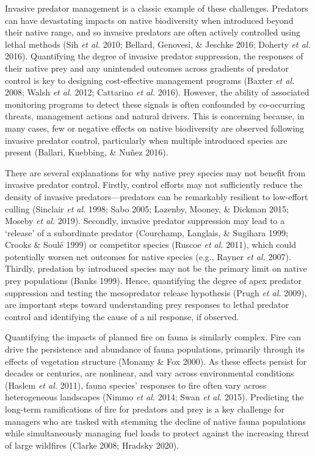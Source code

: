 \documentclass[11pt,a4paper,titlepage,twoside,openright]{style/unimelbthesis}
\begin{document}
\begin{mainmatter}
Invasive predator management is a classic example of these challenges. Predators can have devastating impacts on native biodiversity when introduced beyond their native range, and so invasive predators are often actively controlled using lethal methods (Sih \emph{et al.} 2010; Bellard, Genovesi, \& Jeschke 2016; Doherty \emph{et al.} 2016). Quantifying the degree of invasive predator suppression, the responses of their native prey and any unintended outcomes across gradients of predator control is key to designing cost-effective management programs (Baxter \emph{et al.} 2008; Walsh \emph{et al.} 2012; Cattarino \emph{et al.} 2016). However, the ability of associated monitoring programs to detect these signals is often confounded by co-occurring threats, management actions and natural drivers. This is concerning because, in many cases, few or negative effects on native biodiversity are observed following invasive predator control, particularly when multiple introduced species are present (Ballari, Kuebbing, \& Nuñez 2016).

There are several explanations for why native prey species may not benefit from invasive predator control. Firstly, control efforts may not sufficiently reduce the density of invasive predators---predators can be remarkably resilient to low-effort culling (Sinclair \emph{et al.} 1998; Sabo 2005; Lazenby, Mooney, \& Dickman 2015; Moseby \emph{et al.} 2019). Secondly, invasive predator suppression may lead to a `release' of a subordinate predator (Courchamp, Langlais, \& Sugihara 1999; Crooks \& Soulé 1999) or competitor species (Ruscoe \emph{et al.} 2011), which could potentially worsen net outcomes for native species (e.g., Rayner \emph{et al.} 2007). Thirdly, predation by introduced species may not be the primary limit on native prey populations (Banks 1999). Hence, quantifying the degree of apex predator suppression and testing the mesopredator release hypothesis (Prugh \emph{et al.} 2009), are important steps toward understanding prey responses to lethal predator control and identifying the cause of a nil response, if observed.

Quantifying the impacts of planned fire on fauna is similarly complex. Fire can drive the persistence and abundance of fauna populations, primarily through its effects of vegetation structure (Monamy \& Fox 2000). As these effects persist for decades or centuries, are nonlinear, and vary across environmental conditions (Haslem \emph{et al.} 2011), fauna species' responses to fire often vary across heterogeneous landscapes (Nimmo \emph{et al.} 2014; Swan \emph{et al.} 2015). Predicting the long-term ramifications of fire for predators and prey is a key challenge for managers who are tasked with stemming the decline of native fauna populations while simultaneously managing fuel loads to protect against the increasing threat of large wildfires (Clarke 2008; Hradsky 2020).


\end{mainmatter}
\end{document}

